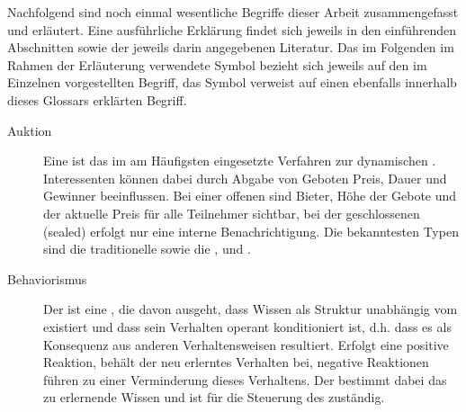 Nachfolgend sind noch einmal wesentliche Begriffe dieser Arbeit
zusammengefasst und erläutert. Eine ausführliche Erklärung findet
sich jeweils in den einführenden Abschnitten sowie der jeweils
darin angegebenen Literatur. Das im Folgenden im Rahmen der
Erläuterung verwendete Symbol \this bezieht sich jeweils auf den
im Einzelnen vorgestellten Begriff, das Symbol \siehe{} verweist
auf einen ebenfalls innerhalb dieses Glossars erklärten Begriff.

\begin{description}
\item[Auktion] Eine \this ist das im  am
Häufigsten eingesetzte Verfahren zur dynamischen
. Interessenten können dabei durch Abgabe von
Geboten Preis, Dauer und Gewinner beeinflussen. Bei einer offenen
\this sind Bieter, Höhe der Gebote und der aktuelle Preis für
alle Teilnehmer sichtbar, bei der geschlossenen (sealed) \this
erfolgt nur eine interne Benachrichtigung. Die bekanntesten Typen
sind die traditionelle  sowie die
,  und  \this.

\item[Behaviorismus] Der \this ist eine , die
davon ausgeht, dass Wissen als Struktur unabhängig vom
 existiert und dass sein Verhalten operant
konditioniert ist, d.h. dass es als Konsequenz aus anderen
Verhaltensweisen resultiert. Erfolgt eine positive Reaktion,
behält der  neu erlerntes Verhalten bei, negative
Reaktionen führen zu einer Verminderung dieses Verhaltens. Der
 bestimmt dabei das zu erlernende Wissen und
ist für die Steuerung des  zuständig.
\end{description}
